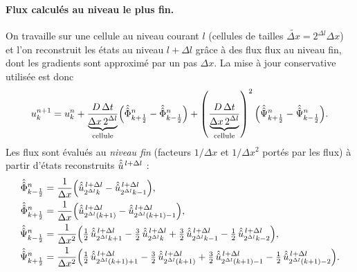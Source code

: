 \paragraph{Flux calculés au niveau le plus fin.}
On travaille sur une cellule au niveau courant $l$ (cellules de tailles $\tilde{\Delta x}=2^{\Delta l}\Delta x$) et l’on reconstruit les états au niveau $l+\Delta l$ grâce à des flux
flux au niveau fin, dont les gradients sont approximé par un pas $\Delta x$. La mise à jour conservative utilisée est donc
\begin{align}
u_k^{n+1}
= u_k^{n}
+ \frac{D\,\Delta t}{\underbrace{\Delta x\,2^{\Delta l}}_{\text{cellule}}}\Bigl(\hat{\hat{\Phi}}_{k+\frac12}^n-\hat{\hat{\Phi}}_{k-\frac12}^n\Bigr)
+ \left(\frac{D\,\Delta t}{\underbrace{\Delta x\,2^{\Delta l}}_{\text{cellule}}}\right)^2 \Bigl(\hat{\hat{\Psi}}_{k+\frac12}^n-\hat{\hat{\Psi}}_{k-\frac12}^n\Bigr).
\end{align}
Les flux sont évalués au \emph{niveau fin} (facteurs $1/\Delta x$ et $1/\Delta x^2$ portés par les flux) à partir d’états reconstruits $\hat{\hat{u}}^{\,l+\Delta l}$ :
\begin{align}
\hat{\hat{\Phi}}_{k-\frac12}^n
&= \frac{1}{\Delta x}\Bigl(
\hat{\hat{u}}^{\,l+\Delta l}_{2^{\Delta l}k}
-\hat{\hat{u}}^{\,l+\Delta l}_{2^{\Delta l}k-1}\Bigr),\\
\hat{\hat{\Phi}}_{k+\frac12}^n
&= \frac{1}{\Delta x}\Bigl(
\hat{\hat{u}}^{\,l+\Delta l}_{2^{\Delta l}(k+1)}
-\hat{\hat{u}}^{\,l+\Delta l}_{2^{\Delta l}(k+1)-1}\Bigr),\\
\hat{\hat{\Psi}}_{k-\frac12}^n
&= \frac{1}{\Delta x^2}\Bigl(
\tfrac12\,\hat{\hat{u}}^{\,l+\Delta l}_{2^{\Delta l}k+1}
-\tfrac32\,\hat{\hat{u}}^{\,l+\Delta l}_{2^{\Delta l}k}
+\tfrac32\,\hat{\hat{u}}^{\,l+\Delta l}_{2^{\Delta l}k-1}
-\tfrac12\,\hat{\hat{u}}^{\,l+\Delta l}_{2^{\Delta l}k-2}\Bigr),\\
\hat{\hat{\Psi}}_{k+\frac12}^n
&= \frac{1}{\Delta x^2}\Bigl(
\tfrac12\,\hat{\hat{u}}^{\,l+\Delta l}_{2^{\Delta l}(k+1)+1}
-\tfrac32\,\hat{\hat{u}}^{\,l+\Delta l}_{2^{\Delta l}(k+1)}
+\tfrac32\,\hat{\hat{u}}^{\,l+\Delta l}_{2^{\Delta l}(k+1)-1}
-\tfrac12\,\hat{\hat{u}}^{\,l+\Delta l}_{2^{\Delta l}(k+1)-2}\Bigr).
\end{align}

